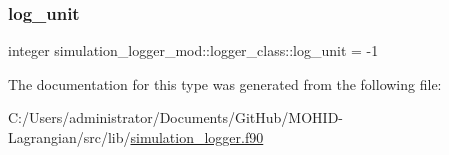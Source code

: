 \subsubsection{\texorpdfstring{log\+\_\+unit}{log\_unit}}
{\footnotesize\ttfamily integer simulation\+\_\+logger\+\_\+mod\+::logger\+\_\+class\+::log\+\_\+unit = -\/1\hspace{0.3cm}{\ttfamily [private]}}



The documentation for this type was generated from the following file\+:\begin{DoxyCompactItemize}
\item 
C\+:/\+Users/administrator/\+Documents/\+Git\+Hub/\+M\+O\+H\+I\+D-\/\+Lagrangian/src/lib/\hyperlink{simulation__logger_8f90}{simulation\+\_\+logger.\+f90}\end{DoxyCompactItemize}
